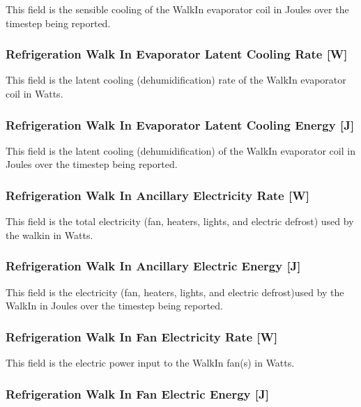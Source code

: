 This field is the sensible cooling of the WalkIn evaporator coil in Joules over the timestep being reported.

\subsubsection{Refrigeration Walk In Evaporator Latent Cooling Rate {[}W{]}}\label{refrigeration-walk-in-evaporator-latent-cooling-rate-w}

This field is the latent cooling (dehumidification) rate of the WalkIn evaporator coil in Watts.

\subsubsection{Refrigeration Walk In Evaporator Latent Cooling Energy {[}J{]}}\label{refrigeration-walk-in-evaporator-latent-cooling-energy-j}

This field is the latent cooling (dehumidification) of the WalkIn evaporator coil in Joules over the timestep being reported.

\subsubsection{Refrigeration Walk In Ancillary Electricity Rate {[}W{]}}\label{refrigeration-walk-in-ancillary-electric-power-w}

This field is the total electricity (fan, heaters, lights, and electric defrost) used by the walkin in Watts.

\subsubsection{Refrigeration Walk In Ancillary Electric Energy {[}J{]}}\label{refrigeration-walk-in-ancillary-electric-energy-j}

This field is the electricity (fan, heaters, lights, and electric defrost)used by the WalkIn in Joules over the timestep being reported.

\subsubsection{Refrigeration Walk In Fan Electricity Rate {[}W{]}}\label{refrigeration-walk-in-fan-electric-power-w}

This field is the electric power input to the WalkIn fan(s) in Watts.

\subsubsection{Refrigeration Walk In Fan Electric Energy {[}J{]}}\label{refrigeration-walk-in-fan-electric-energy-j}

